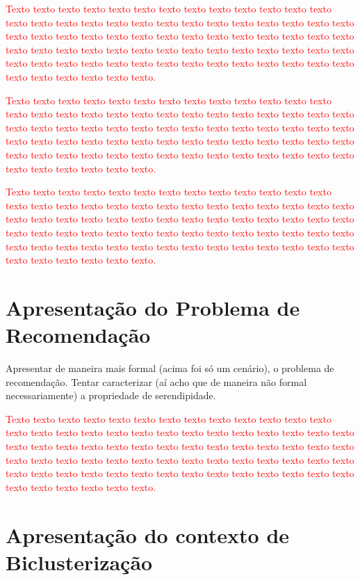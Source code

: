\documentclass[normaltoc, espacoumemeio, pnumromarab,ruledheader]{abnt}
\begin{document}
\textcolor{red}{Texto texto texto texto texto texto texto texto texto texto texto texto texto texto texto texto texto texto texto texto texto texto texto texto texto texto texto texto texto texto texto texto texto texto texto texto texto texto texto texto texto texto texto texto texto texto texto texto texto texto texto texto texto texto texto texto texto texto texto texto texto texto texto texto texto texto texto texto texto texto texto texto texto texto texto.}

\textcolor{red}{Texto texto texto texto texto texto texto texto texto texto texto texto texto texto texto texto texto texto texto texto texto texto texto texto texto texto texto texto texto texto texto texto texto texto texto texto texto texto texto texto texto texto texto texto texto texto texto texto texto texto texto texto texto texto texto texto texto texto texto texto texto texto texto texto texto texto texto texto texto texto texto texto texto texto texto.}

\textcolor{red}{Texto texto texto texto texto texto texto texto texto texto texto texto texto texto texto texto texto texto texto texto texto texto texto texto texto texto texto texto texto texto texto texto texto texto texto texto texto texto texto texto texto texto texto texto texto texto texto texto texto texto texto texto texto texto texto texto texto texto texto texto texto texto texto texto texto texto texto texto texto texto texto texto texto texto texto.}

\section{Apresentação do Problema de Recomendação}

Apresentar de maneira mais formal (acima foi só um cenário), o problema de recomendação. Tentar caracterizar (aí acho que de maneira não formal necessariamente) a propriedade de serendipidade.

\textcolor{red}{Texto texto texto texto texto texto texto texto texto texto texto texto texto texto texto texto texto texto texto texto texto texto texto texto texto texto texto texto texto texto texto texto texto texto texto texto texto texto texto texto texto texto texto texto texto texto texto texto texto texto texto texto texto texto texto texto texto texto texto texto texto texto texto texto texto texto texto texto texto texto texto texto texto texto texto.}

\section{Apresentação do contexto de Biclusterização}
\end{document}
